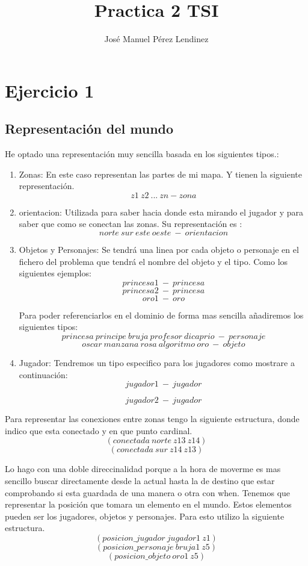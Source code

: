 \documentclass[]{article}
\title{Practica 2 TSI}
\author{José Manuel Pérez Lendinez}
\begin{document}
\maketitle


\newpage
\tableofcontents
\newpage
\section{Ejercicio 1}
\subsection{Representación del mundo}

He optado una representación muy sencilla basada en los siguientes tipos.:
\begin{enumerate}
\item{Zonas: } En este caso representan las partes de mi mapa. Y tienen la siguiente representación.
$$
z1\ z2\ ...\ zn - zona
$$
\item{orientacion: } Utilizada para saber hacia donde esta mirando el jugador y para saber que como se conectan las zonas. Su representación es :
$$
norte\ sur\ este\ oeste\ -\ orientacion
$$

\item{Objetos y Personajes: } Se tendrá una linea por cada objeto o personaje en el fichero del problema que tendrá el nombre del objeto y el tipo. Como los siguientes ejemplos:
$$
princesa1\ -\ princesa
$$
$$
princesa2\ -\ princesa
$$
$$
oro1\ -\ oro
$$

Para poder referenciarlos en el dominio de forma mas sencilla añadiremos los siguientes tipos:
$$
princesa\ principe\ bruja\ profesor\ dicaprio\ -\ personaje
$$
$$
oscar\ manzana\ rosa\ algoritmo\ oro\ -\ objeto
$$

\item{Jugador: } Tendremos un tipo especifico para los jugadores como mostrare a continuación:
$$
jugador1\ -\ jugador
$$

$$
jugador2\ -\ jugador
$$

\end{enumerate}

Para representar las conexiones entre zonas tengo la siguiente estructura, donde indico que esta conectado y en que punto cardinal.
$$
(conectada\ norte\ z13\ z14)
$$
$$
(conectada\ sur\ z14\ z13)
$$

Lo hago con una doble direccinalidad porque a la hora de moverme es mas sencillo buscar directamente desde la actual hasta la de destino que estar comprobando si esta guardada de una manera o otra con when. 
Tenemos que representar la posición que tomara un elemento en el mundo. Estos elementos pueden ser los jugadores, objetos y personajes. Para esto utilizo la siguiente estructura. 
$$
(posicion\_jugador\ jugador1\ z1)
$$
$$
(posicion\_personaje\ bruja1\ z5)
$$
$$
(posicion\_objeto\ oro1\ z5)
$$
\end{document}

